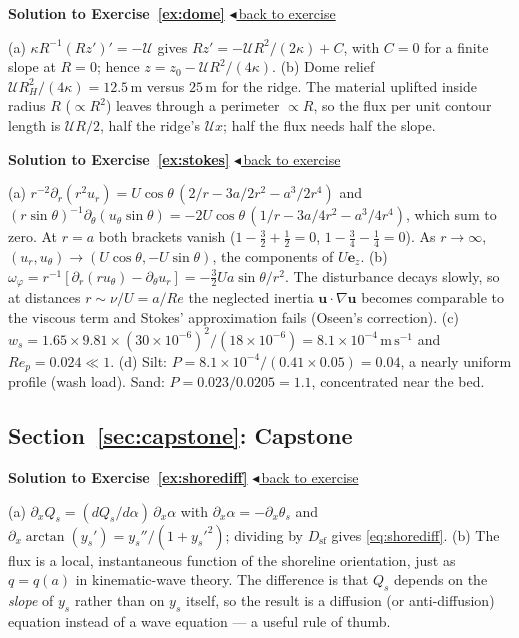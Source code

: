 \documentclass[11pt,letterpaper]{article}
\numberwithin{equation}{section}
\newcommand{\uu}{\mathbf{u}}
\newcommand{\e}[1]{\mathbf{e}_{#1}}
\newcommand{\units}[1]{\,\mathrm{#1}}
\newenvironment{solution}[1]{%
  \par\addvspace{1.0ex}\noindent\phantomsection\label{sol:#1}%
  {\color{exorange!85!black}\bfseries Solution to Exercise~\ref{ex:#1}}%
  \hfill\hyperref[ex:#1]{\small$\blacktriangleleft$\,back to exercise}\par\nopagebreak\smallskip}%
  {\par\smallskip\noindent{\color{exorange!40}\rule{\linewidth}{0.4pt}}\par}
\newcommand{\Up}{\mathcal{U}}
\begin{document}
\begin{solution}{dome}
(a) $\kappa R^{-1}(Rz')'=-\Up$ gives $Rz'=-\Up R^2/(2\kappa)+C$, with $C=0$ for a finite slope at $R=0$; hence $z=z_0-\Up R^2/(4\kappa)$.
(b) Dome relief $\Up R_H^2/(4\kappa)=12.5\units{m}$ versus $25\units{m}$ for the ridge. The material uplifted inside radius $R$ ($\propto R^2$) leaves through a perimeter
$\propto R$, so the flux per unit contour length is $\Up R/2$, half the ridge's $\Up x$; half the flux needs half the slope.
\end{solution}

\begin{solution}{stokes}
(a) $r^{-2}\partial_r(r^2u_r)=U\cos\theta\,(2/r-3a/2r^2-a^3/2r^4)$ and $(r\sin\theta)^{-1}\partial_\theta(u_\theta\sin\theta)=-2U\cos\theta\,(1/r-3a/4r^2-a^3/4r^4)$,
which sum to zero. At $r=a$ both brackets vanish ($1-\tfrac32+\tfrac12=0$, $1-\tfrac34-\tfrac14=0$). As $r\to\infty$, $(u_r,u_\theta)\to(U\cos\theta,-U\sin\theta)$, the
components of $U\e{z}$.
(b) $\omega_\varphi=r^{-1}[\partial_r(ru_\theta)-\partial_\theta u_r]=-\tfrac32Ua\sin\theta/r^2$. The disturbance decays slowly, so at distances $r\sim\nu/U=a/Re$ the neglected
inertia $\uu\cdot\nabla\uu$ becomes comparable to the viscous term and Stokes' approximation fails (Oseen's correction).
(c) $w_s=1.65\times9.81\times(30\times10^{-6})^2/(18\times10^{-6})=8.1\times10^{-4}\units{m\,s^{-1}}$ and $Re_p=0.024\ll1$.
(d) Silt: $P=8.1\times10^{-4}/(0.41\times0.05)=0.04$, a nearly uniform profile (wash load). Sand: $P=0.023/0.0205=1.1$, concentrated near the bed.
\end{solution}

\subsection*{Section~\ref{sec:capstone}: Capstone}

\begin{solution}{shorediff}
(a) $\partial_xQ_s=(dQ_s/d\alpha)\,\partial_x\alpha$ with $\partial_x\alpha=-\partial_x\theta_s$ and $\partial_x\arctan(y_s')=y_s''/(1+y_s'^2)$; dividing by $D_{\mathrm{sf}}$ gives
\eqref{eq:shorediff}.
(b) The flux is a local, instantaneous function of the shoreline orientation, just as $q=q(a)$ in kinematic-wave theory. The difference is that $Q_s$ depends on
the \emph{slope} of $y_s$ rather than on $y_s$ itself, so the result is a diffusion (or anti-diffusion) equation instead of a wave equation --- a useful rule of thumb.
\end{solution}
\end{document}
